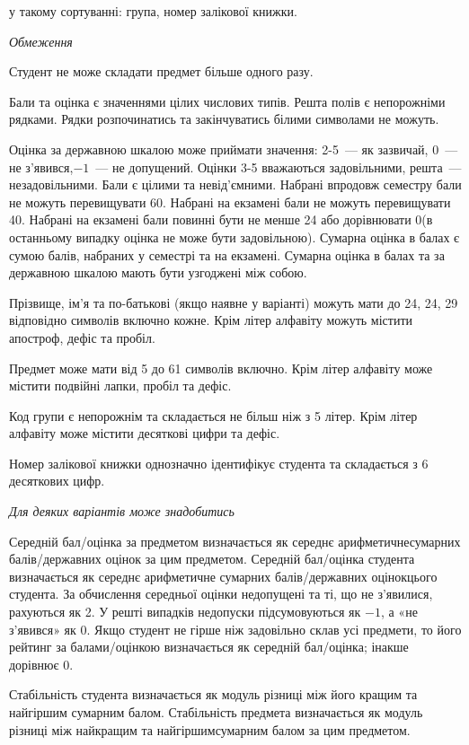 \documentclass[11pt, ukrainian]{article}
\begin{document}
{\noindent}у такому сортуванні: група, номер залікової книжки.


\bigskip\textit{Обмеження}

Студент не може складати предмет більше одного разу.

Бали та оцінка є значеннями цілих числових типів. Решта полів є непорожніми рядками.
Рядки розпочинатись та закінчуватись білими символами не можуть.

Оцінка за державною шкалою може приймати значення: 2-5~--- як зазвичай, 0~--- не з’явився,$-1$~--- не допущений. 
Оцінки 3-5 вважаються задовільними, решта~--- незадовільними. 
Бали є цілими та невід’ємними.
Набрані впродовж семестру бали не можуть перевищувати 60. 
Набрані на екзамені бали не можуть перевищувати 40. 
Набрані на екзамені бали повинні бути не менше 24 або дорівнювати 0(в останньому випадку оцінка не може бути задовільною). 
Сумарна оцінка в балах є сумою балів, набраних у семестрі та на екзамені.
Сумарна оцінка в балах та за державною шкалою мають бути узгоджені між собою.

Прізвище, ім’я та по-батькові (якщо наявне у варіанті) можуть мати до 24, 24, 29 відповідно символів включно кожне. 
Крім літер алфавіту можуть містити апостроф, дефіс та пробіл.

Предмет може мати від 5 до 61 символів включно. 
Крім літер алфавіту може містити подвійні лапки, пробіл та дефіс.

Код групи є непорожнім та складається не більш ніж з 5 літер. 
Крім літер алфавіту може містити десяткові цифри та дефіс.


Номер залікової книжки однозначно ідентифікує студента та складається з 6 десяткових цифр. 

\bigskip\textit{Для деяких варіантів може знадобитись}

Середній бал/оцінка за предметом визначається як середнє арифметичнесумарних балів/державних оцінок за цим предметом. 
Середній бал/оцінка студента визначається як середнє арифметичне сумарних балів/державних оцінокцього студента. 
За обчислення середньої оцінки недопущені та ті, що не з’явилися, рахуються як 2.
У решті випадків недопуски підсумовуються як $-1$, а «не з’явився» як 0.
Якщо студент не гірше ніж задовільно склав усі предмети, 
то його рейтинг за балами/оцінкою визначається як середній бал/оцінка; інакше дорівнює 0.

Стабільність студента визначається як модуль різниці між його кращим та найгіршим сумарним балом.
Стабільність предмета визначається як модуль різниці між найкращим та найгіршимсумарним балом за цим предметом.
\end{document}

